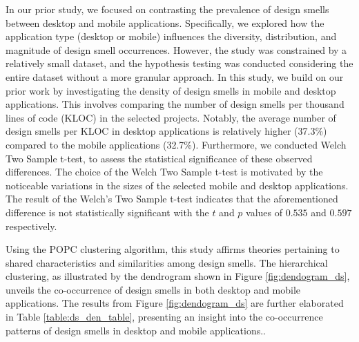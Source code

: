 \documentclass[AMA,Times1COL]{WileyNJDv5} %
\begin{document}
	In our prior study\cite{ogenrwot}, we focused on contrasting the prevalence of design smells between desktop and mobile applications. Specifically, we explored how the application type (desktop or mobile) influences the diversity, distribution, and magnitude of design smell occurrences. However, the study was constrained by a relatively small dataset, and the hypothesis testing was conducted considering the entire dataset without a more granular approach. In this study, we build on our prior work by investigating the density of design smells in mobile and desktop applications. This involves comparing the number of design smells per thousand lines of code (KLOC) in the selected projects. Notably, the average number of design smells per KLOC in desktop applications is relatively higher (37.3\%) compared to the mobile applications (32.7\%). Furthermore, we conducted Welch Two Sample t-test, to assess the statistical significance of these observed differences. The choice of the Welch Two Sample t-test is motivated by the noticeable variations in the sizes of the selected mobile and desktop applications. The result of the Welch's Two Sample t-test indicates that the aforementioned difference is not statistically significant  with the $t$ and $p$ values of $0.535$ and $0.597$ respectively.

	Using the POPC clustering algorithm, this study affirms theories pertaining to shared characteristics and similarities among design smells. The hierarchical clustering, as illustrated by the dendrogram shown in Figure \ref{fig:dendogram_ds}, unveils the co-occurrence of design smells in both desktop and mobile applications. The results from Figure \ref{fig:dendogram_ds} are further elaborated in Table \ref{table:ds_den_table}, presenting an insight into the co-occurrence patterns of design smells in desktop and mobile applications..
	
\end{document}
